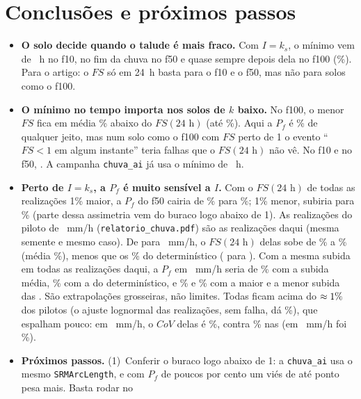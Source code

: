 \documentclass[11pt,a4paper]{article}
\begin{document}
\section{Conclusões e próximos passos}\label{sec:conclusoes}
\begin{itemize}
\item \textbf{O solo decide quando o talude é mais fraco.} Com $I = k_s$, o mínimo vem de \QuandoFaixaDez~h no f10, no
fim da chuva no f50 e quase sempre depois dela no f100 (\DepoisPctCem\%). Para o artigo: o $FS$ só em 24~h basta
para o f10 e o f50, mas não para solos como o f100.
\item \textbf{O mínimo no tempo importa nos solos de $k$ baixo.} No f100, o menor $FS$ fica em média \AbaixoMediaCem\%
abaixo do $FS(24\text{ h})$ (até \AbaixoMaxCem\%). Aqui a $P_f$ é \PfMinCem\% de qualquer jeito, mas num solo como o
f100 com $FS$ perto de 1 o evento ``$FS < 1$ em algum instante'' teria falhas que o $FS(24\text{ h})$ não vê. No f10 e
no f50, \FalhaForaDois. A campanha \texttt{chuva\_ai} já usa o mínimo de \ChuvaAITempos~h.
\item \textbf{Perto de $I = k_s$, a $P_f$ é muito sensível a $I$.} Com o $FS(24\text{ h})$ de todas as realizações 1\%
maior, a $P_f$ do f50 cairia de \PfMinCinquenta\% para \PfMaisUm\%; 1\% menor, subiria para \PfMenosUm\% (parte
dessa assimetria vem do buraco logo abaixo de 1). As \NPiloto{} realizações do piloto de \Iref~mm/h
(\texttt{relatorio\_chuva.pdf}) são as realizações \PilotoReais{} daqui (mesma semente e mesmo caso). De \ICinquenta{}
para \Iref~mm/h, o $FS(24\text{ h})$ delas sobe de \SobeMin\% a \SobeMax\% (média \SobeMedia\%), menos que os \SobeDet\%
do determinístico (\DetCinquentaVinteQuatro{} para \DetIref). Com a mesma subida em todas as realizações daqui, a $P_f$
em \Iref~mm/h seria de \PfEstMedia\% com a subida média, \PfEstDet\% com a do determinístico, e \PfEstSobeMax\% e
\PfEstSobeMin\% com a maior e a menor subida das \NPiloto. São extrapolações grosseiras, não limites. Todas ficam
acima do $\approx1\%$ dos pilotos (o ajuste lognormal das \NPiloto{} realizações, sem falha, dá
\PilotoLognormal\%), que espalham pouco: em \ICinquenta~mm/h, o $CoV$ delas é \PilotoCovAqui\%, contra
\CovCinquentaVinteQuatro\% nas \NCinquenta{} (em \Iref~mm/h foi \PilotoCov\%).
\item \textbf{Próximos passos.} (1)~Conferir o buraco logo abaixo de 1: a \texttt{chuva\_ai} usa o mesmo
\texttt{SRMArcLength}, e com $P_f$ de poucos por cento um viés de até \BuracoPontos{} ponto pesa mais. Basta rodar no

\end{itemize}
\end{document}
